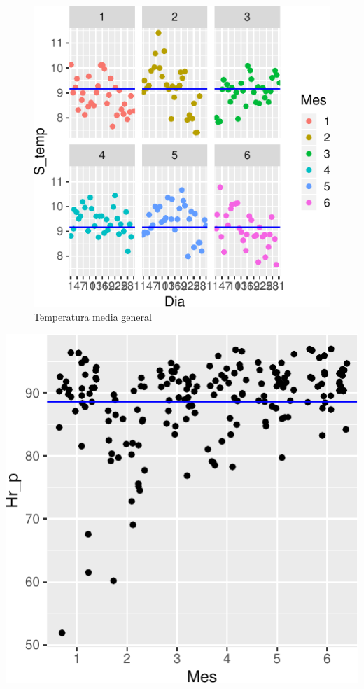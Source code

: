 \documentclass[letterpaper,9pt,twocolumn,twoside,]{pinp}
\begin{document}
\begin{figure}

{\centering \includegraphics{report_hidrolgy_files/figure-latex/unnamed-chunk-4-1} 

}

\caption{Temperatura media general}\label{fig:unnamed-chunk-4}
\end{figure}

\begin{center}\includegraphics{report_hidrolgy_files/figure-latex/unnamed-chunk-5-1} \end{center}
\end{document}
